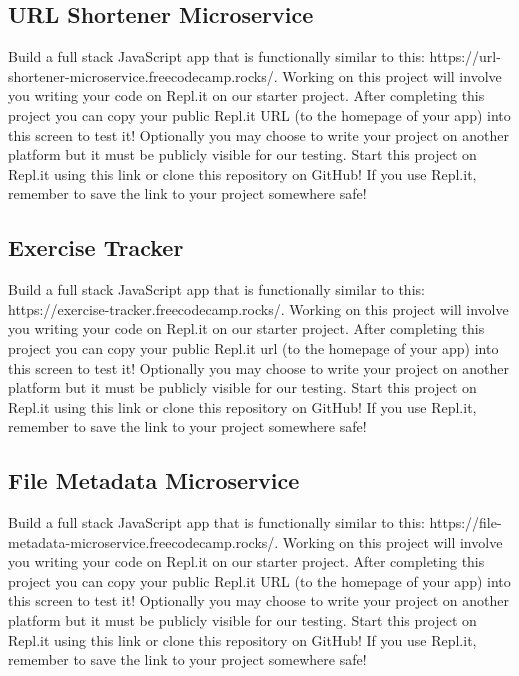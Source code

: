 \documentclass{article}%
\begin{document}
\subsection{URL Shortener Microservice}%
\label{subsec:URLShortenerMicroservice}%
Build a full stack JavaScript app that is functionally similar to this: https://url{-}shortener{-}microservice.freecodecamp.rocks/.\newline%
Working on this project will involve you writing your code on Repl.it on our starter project. After completing this project you can copy your public Repl.it URL (to the homepage of your app) into this screen to test it! Optionally you may choose to write your project on another platform but it must be publicly visible for our testing.\newline%
Start this project on Repl.it using this link or clone this repository on GitHub! If you use Repl.it, remember to save the link to your project somewhere safe!\newline%

%
\subsection{Exercise Tracker}%
\label{subsec:ExerciseTracker}%
Build a full stack JavaScript app that is functionally similar to this: https://exercise{-}tracker.freecodecamp.rocks/.\newline%
Working on this project will involve you writing your code on Repl.it on our starter project. After completing this project you can copy your public Repl.it url (to the homepage of your app) into this screen to test it! Optionally you may choose to write your project on another platform but it must be publicly visible for our testing.\newline%
Start this project on Repl.it using this link or clone this repository on GitHub! If you use Repl.it, remember to save the link to your project somewhere safe!\newline%

%
\subsection{File Metadata Microservice}%
\label{subsec:FileMetadataMicroservice}%
Build a full stack JavaScript app that is functionally similar to this: https://file{-}metadata{-}microservice.freecodecamp.rocks/.\newline%
Working on this project will involve you writing your code on Repl.it on our starter project. After completing this project you can copy your public Repl.it URL (to the homepage of your app) into this screen to test it! Optionally you may choose to write your project on another platform but it must be publicly visible for our testing.\newline%
Start this project on Repl.it using this link or clone this repository on GitHub! If you use Repl.it, remember to save the link to your project somewhere safe!\newline%

%
\newpage%
\end{document}

